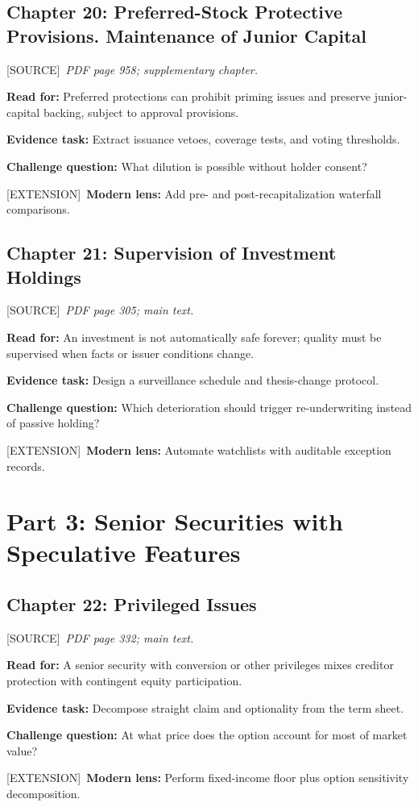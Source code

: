 \documentclass[11pt,letterpaper]{article}
\newcommand{\src}{\textsf{\color{sea}[SOURCE]}}
\newcommand{\ext}{\textsf{\color{gold}[EXTENSION]}}
\begin{document}
\subsection{Chapter 20: Preferred-Stock Protective Provisions. Maintenance of Junior Capital}
\src\ \textit{PDF page 958; supplementary chapter.}\par
\textbf{Read for:} Preferred protections can prohibit priming issues and preserve junior-capital backing, subject to approval provisions.\par
\textbf{Evidence task:} Extract issuance vetoes, coverage tests, and voting thresholds.\par
\textbf{Challenge question:} What dilution is possible without holder consent?\par
\ext\ \textbf{Modern lens:} Add pre- and post-recapitalization waterfall comparisons.\par

\subsection{Chapter 21: Supervision of Investment Holdings}
\src\ \textit{PDF page 305; main text.}\par
\textbf{Read for:} An investment is not automatically safe forever; quality must be supervised when facts or issuer conditions change.\par
\textbf{Evidence task:} Design a surveillance schedule and thesis-change protocol.\par
\textbf{Challenge question:} Which deterioration should trigger re-underwriting instead of passive holding?\par
\ext\ \textbf{Modern lens:} Automate watchlists with auditable exception records.\par

\section{Part 3: Senior Securities with Speculative Features}

\subsection{Chapter 22: Privileged Issues}
\src\ \textit{PDF page 332; main text.}\par
\textbf{Read for:} A senior security with conversion or other privileges mixes creditor protection with contingent equity participation.\par
\textbf{Evidence task:} Decompose straight claim and optionality from the term sheet.\par
\textbf{Challenge question:} At what price does the option account for most of market value?\par
\ext\ \textbf{Modern lens:} Perform fixed-income floor plus option sensitivity decomposition.\par
\end{document}
